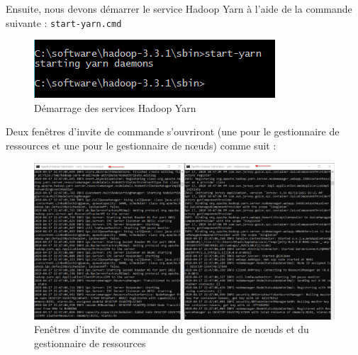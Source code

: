 \begin{enumerate}
\newpage
Ensuite, nous devons démarrer le service Hadoop Yarn à l'aide de la commande suivante : \texttt{start-yarn.cmd}
\begin{figure}[h]
	\centering
    \includegraphics[scale=0.6]{img/part3/3.4}
    \caption{Démarrage des services Hadoop Yarn}
\end{figure}

Deux fenêtres d'invite de commande s'ouvriront (une pour le gestionnaire de ressources et une pour le gestionnaire de nœuds) comme suit :
\begin{figure}[h]
	\centering
    \includegraphics[scale=0.6]{img/part3/3.5}
    \caption{Fenêtres d'invite de commande du gestionnaire de nœuds et du gestionnaire de ressources}
\end{figure}

\end{enumerate}